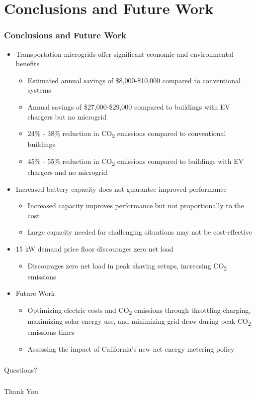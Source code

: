\documentclass[aspectratio=169, 8 pt]{beamer}
\begin{document}
\section{Conclusions and Future Work}		
		
		\begin{frame}
			\frametitle{Conclusions and Future Work}
			\begin{itemize} \Large
				\item Transportation-microgrids offer significant economic and environmental benefits
					\begin{itemize} \large
						\item Estimated annual savings of \$8,000-\$10,000 compared to conventional systems
						\item Annual savings of \$27,000-\$29,000 compared to buildings with EV chargers but no microgrid
						\item 24\% - 38\% reduction in CO\textsubscript{2} emissions compared to conventional buildings
						\item 45\% - 55\% reduction in CO\textsubscript{2} emissions compared to buildings with EV chargers and no microgrid
					\end{itemize}
				\item Increased battery capacity does not guarantee improved performance
					\begin{itemize} \large
						\item Increased capacity improves performance but not proportionally to the cost
						\item Large capacity needed for challenging situations may not be cost-effective 
					\end{itemize}
				\item 15 kW demand price floor discourages zero net load
					\begin{itemize} \large
						\item Discourages zero net load in peak shaving setups, increasing CO\textsubscript{2} emissions
					\end{itemize}
				\item Future Work
					\begin{itemize} \large
						\item Optimizing electric costs and CO\textsubscript{2} emissions through throttling charging, maximizing solar energy use, and minimizing grid draw during peak CO\textsubscript{2} emissions times
						\item Assessing the impact of California's new net energy metering policy
					\end{itemize}
			\end{itemize}
		\end{frame}
	
	\begin{frame}
		\frametitle{\null}
		\centering
		\Huge
		Questions?
	\end{frame}
	
	\begin{frame}
		\frametitle{\null}
		\centering
		\Huge
		Thank You
	\end{frame}
\end{document}
